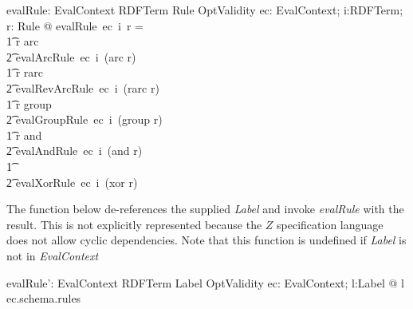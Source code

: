 \documentclass[fuzz]{llncs}
\def\entryFor{\cdot}
\def\zc{\textit}
\begin{document}
\begin{gendef}
   evalRule: EvalContext \fun RDFTerm \fun Rule \fun OptValidity
\where
   \forall ec: EvalContext; i:RDFTerm; r: Rule @ evalRule~ec~i~r = \\
\t1 \IF r \in \ran arc \\
\t2 \THEN evalArcRule~ec~i~(arc \entryFor r) \\
\t1 \ELSE \IF r \in \ran rarc \\
\t2 \THEN evalRevArcRule~ec~i~(rarc \entryFor r) \\
\t1 \ELSE \IF r \in \ran group \\
\t2 \THEN evalGroupRule~ec~i~(group \entryFor r) \\
\t1 \ELSE \IF r \in \ran and \\
\t2 \THEN evalAndRule~ec~i~(and \entryFor r) \\
\t1 \ELSE \\
\t2 evalXorRule~ec~i~(xor \entryFor r)
\end{gendef}
The function below de-references the supplied \zc{Label} and
invoke \zc{evalRule} with the result.  This is not explicitly represented because
the $Z$ specification language does not allow cyclic dependencies. Note that this function
is undefined if \zc{Label} is not in \zc{EvalContext}
\begin{gendef}
   evalRule': EvalContext \fun RDFTerm \fun Label \fun OptValidity
\where
   \forall ec: EvalContext; l:Label @ l \in \dom ec.schema.rules
\end{gendef}
\end{document}
